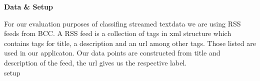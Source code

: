 \begin{center} \textbf{\huge Data \& Setup} \end{center}
For our evaluation purposes of classifing streamed textdata we are using RSS feeds from BCC. A RSS feed is a collection of tags in xml structure which contains tags for title, a description and an url among other tags. Those listed are used in our applicaton. Our data points are constructed from title and description of the feed, the url gives us the respective label.\\
setup   

